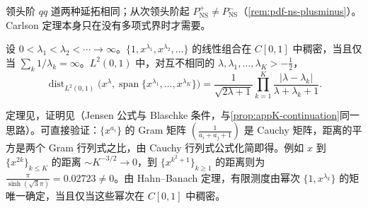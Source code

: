 领头阶 $qq$ 道两种延拓相同；从次领头阶起 $P^+_{\mathrm{NS}}\ne P^-_{\mathrm{NS}}$（\cref{rem:pdf-ns-plusminus}）。Carlson 定理本身只在没有多项式界时才需要。

\begin{theorem}\label{thm:appK-muntz}
设 $0<\lambda_1<\lambda_2<\cdots\to\infty$。$\{1,x^{\lambda_1},x^{\lambda_2},\dots\}$ 的线性组合在 $C[0,1]$ 中稠密，当且仅当 $\sum_k1/\lambda_k=\infty$。$L^2(0,1)$ 中，对互不相同的 $\lambda,\lambda_1,\dots,\lambda_K>-\frac12$，
\begin{equation}\label{eq:appK-muntz}
\operatorname{dist}_{L^2(0,1)}\big(x^\lambda,\operatorname{span}\{x^{\lambda_1},\dots,x^{\lambda_K}\}\big)=\frac{1}{\sqrt{2\lambda+1}}\prod_{k=1}^K\frac{|\lambda-\lambda_k|}{\lambda+\lambda_k+1}.
\end{equation}
\end{theorem}

定理见\cite{Muntz1914,Szasz1916}，证明见\cite[第~15.25--15.27~节]{Rudin1987}（Jensen 公式与 Blaschke 条件，与\cref{prop:appK-continuation}同一思路）。可直接验证：$\{x^{a_i}\}$ 的 Gram 矩阵 $(\frac1{a_i+a_j+1})$ 是 Cauchy 矩阵，距离的平方是两个 Gram 行列式之比，由 Cauchy 行列式公式化简即得。例如 $x$ 到 $\{x^{2k}\}_{k\le K}$ 的距离 $\sim K^{-3/2}\to0$，到 $\{x^{k^2+1}\}_{k\ge1}$ 的距离则为 $\frac{\pi}{\sinh(\sqrt3\pi)}=0.02723\ne0$。由 Hahn--Banach 定理，有限测度由幂次 $\{1,x^{\lambda_k}\}$ 的矩唯一确定，当且仅当这些幂次在 $C[0,1]$ 中稠密。
